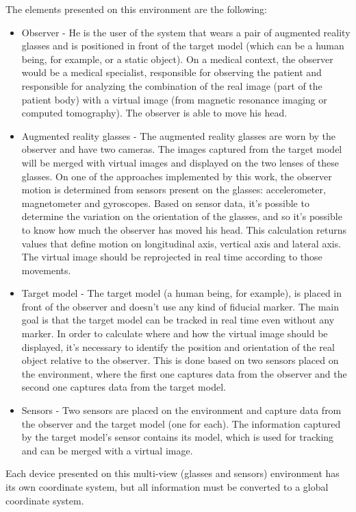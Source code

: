 \documentclass[msc, a4paper, classic, en]{ufbathesis}
\begin{document}
The elements presented on this environment are the following:

\begin{itemize}
  \item Observer - He is the user of the system that wears a pair of augmented reality glasses and is positioned in front of the target model (which can be a human being, for example, or a static object). On a medical context, the observer would be a medical specialist, responsible for observing the patient and responsible for analyzing the combination of the real image (part of the patient body) with a virtual image (from magnetic resonance imaging or computed tomography). The observer is able to move his head.
  \item Augmented reality glasses - The augmented reality glasses are worn by the observer and have two cameras. The images captured from the target model will be merged with virtual images and displayed on the two lenses of these glasses. On one of the approaches implemented by this work, the observer motion is determined from sensors present on the glasses: accelerometer, magnetometer and gyroscopes. Based on sensor data, it's possible to determine the variation on the orientation of the glasses, and so it's possible to know how much the observer has moved his head. This calculation returns values that define motion on longitudinal axis, vertical axis and lateral axis. The virtual image should be reprojected in real time according to those movements.
  \item Target model - The target model (a human being, for example), is placed in front of the observer and doesn't use any kind of fiducial marker. The main goal is that the target model can be tracked in real time even without any marker. In order to calculate where and how the virtual image should be displayed, it's necessary to identify the position and orientation of the real object relative to the observer. This is done based on two sensors placed on the environment, where the first one captures data from the observer and the second one captures data from the target model.
  \item Sensors - Two sensors are placed on the environment and capture data from the observer and the target model (one for each). The information captured by the target model's sensor contains its model, which is used for tracking and can be merged with a virtual image.
\end{itemize}

Each device presented on this multi-view (glasses and sensors) environment has its own coordinate system, but all information must be converted to a global coordinate system.
\end{document}
